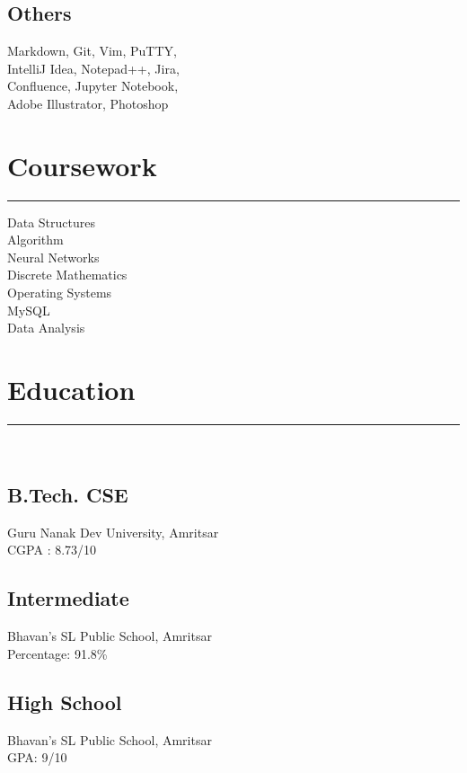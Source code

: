 \documentclass[]{puneet-resume}
\begin{document}
\begin{minipage}[t]{0.33\textwidth}
\subsection{Others}
Markdown, Git, Vim, PuTTY,\\
IntelliJ Idea, Notepad++, Jira,\\
Confluence, Jupyter Notebook,\\
Adobe Illustrator, Photoshop
\sectionsep
\section{Coursework}
\noindent\rule{5cm}{0.4pt}

Data Structures\\
Algorithm\\
Neural Networks\\
Discrete Mathematics\\
Operating Systems\\
MySQL\\
Data Analysis
\sectionsep
\section{Education} 
\noindent\rule{5cm}{0.4pt}\\
\subsection{B.Tech. CSE}
Guru Nanak Dev University, Amritsar\\
CGPA : 8.73/10\\
\vspace{8pt}
\subsection{Intermediate}
Bhavan's SL Public School, Amritsar\\
Percentage: 91.8\%\\
\vspace{8pt}
\subsection{High School}
Bhavan's SL Public School, Amritsar\\
GPA: 9/10
\sectionsep
%
%

\end{minipage} 
\end{document}
